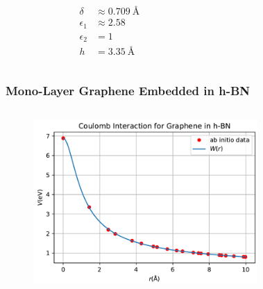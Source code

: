 \documentclass{beamer}
\begin{document}
\begin{frame}
\begin{columns}
\begin{figure}
    \end{figure}
    \begin{equation*}
    \begin{split}
        \delta &\approx \SI{0.709}{\angstrom}\\
        \epsilon_1&\approx 2.58\\
        \epsilon_2 &= 1\\
        h &= \SI{3.35}{\angstrom}
    \end{split}
    \end{equation*}
    \end{columns}
\end{frame}

\begin{frame}
    \frametitle{Mono-Layer Graphene Embedded in h-BN}
    \begin{columns}
    \begin{figure}[H]
        \centering
        \includegraphics[width=\textwidth]{img/cho_2018_BN_all.pdf}
    \end{figure}
        \begin{figure}
        \centering

\end{figure}
\end{columns}
\end{frame}
\end{document}
